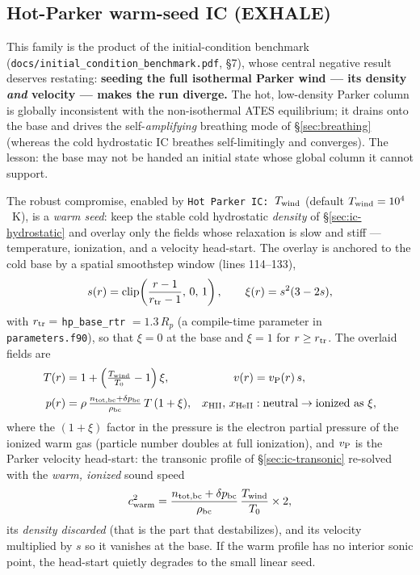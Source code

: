 \documentclass[english,a4paper]{kiseon_memo}
\begin{document}
\subsection{Hot-Parker warm-seed IC (EXHALE)}
\label{sec:ic-hotparker}

This family is the product of the initial-condition benchmark
(\texttt{docs/initial\_condition\_benchmark.pdf}, \S7), whose central
negative result deserves restating: \textbf{seeding the full
isothermal Parker wind --- its density \emph{and} velocity --- makes
the run diverge.} The hot, low-density Parker column is globally
inconsistent with the non-isothermal ATES equilibrium; it drains onto
the base and drives the self-\emph{amplifying} breathing mode of
\S\ref{sec:breathing} (whereas the cold hydrostatic IC breathes
self-limitingly and converges). The lesson: the base may not be handed
an initial state whose global column it cannot support.

The robust compromise, enabled by
\texttt{Hot Parker IC: $T_{\rm wind}$} (default
$T_{\rm wind} = 10^4$~K), is a \emph{warm seed}: keep the stable cold
hydrostatic \emph{density} of \S\ref{sec:ic-hydrostatic} and overlay
only the fields whose relaxation is slow and stiff --- temperature,
ionization, and a velocity head-start. The overlay is anchored to the
cold base by a spatial smoothstep window (lines 114--133),
\begin{equation}
s(r) = \mathrm{clip}\!\left(\frac{r - 1}{r_{\rm tr} - 1},\, 0,\, 1\right),
\qquad
\xi(r) = s^2 (3 - 2s),
\end{equation}
with $r_{\rm tr} = $ \texttt{hp\_base\_rtr} $= 1.3\,R_p$ (a
compile-time parameter in \texttt{parameters.f90}), so that $\xi = 0$
at the base and $\xi = 1$ for $r \ge r_{\rm tr}$. The overlaid fields
are
\begin{align}
T(r)   &= 1 + \left(\tfrac{T_{\rm wind}}{T_0} - 1\right)\xi, &
v(r)   &= v_{\rm P}(r)\, s, \nonumber\\[2pt]
p(r)   &= \rho\,\tfrac{n_{\rm tot,bc}+\delta p_{\rm bc}}{\rho_{\rm bc}}\,
          T\,(1 + \xi), &
x_{\rm HII},\, x_{\rm HeII} &: \mbox{neutral} \to \mbox{ionized as } \xi,
\end{align}
where the $(1+\xi)$ factor in the pressure is the electron partial
pressure of the ionized warm gas (particle number doubles at full
ionization), and $v_{\rm P}$ is the Parker velocity head-start: the
transonic profile of \S\ref{sec:ic-transonic} re-solved with the
\emph{warm, ionized} sound speed
\begin{equation}
c^2_{\rm warm}
   = \frac{n_{\rm tot,bc}+\delta p_{\rm bc}}{\rho_{\rm bc}}\,
     \frac{T_{\rm wind}}{T_0}\times 2,
\end{equation}
its \emph{density discarded} (that is the part that destabilizes), and
its velocity multiplied by $s$ so it vanishes at the base. If the warm
profile has no interior sonic point, the head-start quietly degrades
to the small linear seed.
\end{document}
